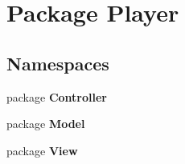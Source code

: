 \section{Package Player}
\label{namespace_player}
\subsection*{Namespaces}
\begin{DoxyCompactItemize}
\item 
package {\bf Controller}
\item 
package {\bf Model}
\item 
package {\bf View}
\end{DoxyCompactItemize}

